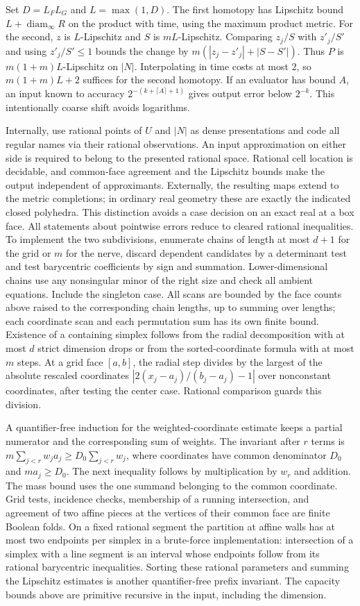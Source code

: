 Set $D=L_FL_G$ and $L=\max(1,D)$. The first homotopy has Lipschitz bound
$L+\operatorname{diam}_\infty R$ on the product with time, using the maximum
product metric. For the second, $z$ is $L$-Lipschitz and $S$ is
$mL$-Lipschitz. Comparing $z_j/S$ with $z'_j/S'$ and using
$z'_j/S'\leq1$ bounds the change by
$m(|z_j-z'_j|+|S-S'|)$. Thus $P$ is $m(1+m)L$-Lipschitz on $|N|$.
Interpolating in time costs at most $2$, so $m(1+m)L+2$ suffices for
the second homotopy. If an evaluator has bound $A$, an input known to
accuracy $2^{-(k+\lceil A\rceil+1)}$ gives output error below $2^{-k}$.
This intentionally coarse shift avoids logarithms.

Internally, use rational points of $U$ and $|N|$ as dense presentations
and code all regular names via their rational observations. An input
approximation on either side is required to belong to the presented
rational space. Rational cell location is decidable, and common-face
agreement and the Lipschitz bounds make the output independent of
approximants. Externally, the resulting maps extend to the metric
completions; in ordinary real geometry these are exactly the indicated
closed polyhedra. This distinction avoids a case decision on an exact
real at a box face. All statements about pointwise errors reduce to
cleared rational inequalities. To implement the two subdivisions,
enumerate chains of length at most $d+1$ for the grid or $m$ for the
nerve, discard dependent candidates by a determinant test and test
barycentric coefficients by sign and summation. Lower-dimensional
chains use any nonsingular minor of the right size and check all ambient
equations. Include the singleton case. All scans are bounded by the
face counts above raised to the corresponding chain lengths, up to
summing over lengths; each coordinate scan and each permutation sum has
its own finite bound. Existence of a containing simplex follows from
the radial decomposition with at most $d$ strict dimension drops or
from the sorted-coordinate formula with at most $m$ steps. At a grid
face $[a,b]$, the radial step divides by the largest of the absolute
rescaled coordinates $|2(x_j-a_j)/(b_j-a_j)-1|$ over nonconstant
coordinates, after testing the center case. Rational comparison guards
this division.

A quantifier-free induction for the weighted-coordinate estimate keeps
a partial numerator and the corresponding sum of weights. The invariant
after $r$ terms is
$m\sum_{j<r}w_j a_j\geq D_0\sum_{j<r}w_j$, where coordinates have
common denominator $D_0$ and $m a_j\geq D_0$. The next inequality follows
by multiplication by $w_r$ and addition. The mass bound uses the
one summand belonging to the common coordinate. Grid tests, incidence
checks, membership of a running intersection, and agreement of two
affine pieces at the vertices of their common face are finite Boolean
folds. On a fixed rational segment the partition at affine walls has
at most two endpoints per simplex in a brute-force implementation:
intersection of a simplex with a line segment is an interval whose
endpoints follow from its rational barycentric inequalities. Sorting
these rational parameters and summing the Lipschitz estimates is
another quantifier-free prefix invariant. The capacity bounds above
are primitive recursive in the input, including the dimension.

